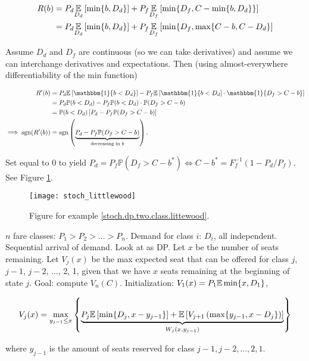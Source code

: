 \begin{example}
 \begin{align*}
 R(b) & = P_d \underset{D_d}{\mathbb{E}} \left[  \min\{b, D_d\} \right] + P_f  \underset{D_f}{\mathbb{E}} \left[ \min\{D_f, C - \min\{b, D_d\}\} \right]
 \\ & = P_d \underset{D_d}{\mathbb{E}} \left[  \min\{b, D_d\} \right] + P_f \underset{D_f}{\mathbb{E}} \left[ \min\{D_f,  \max\{C - b, C -  D_d\} \right]
 \end{align*}
 
Assume \(D_d\) and \(D_f\) are continuous (so we can take derivatives) and assume we can interchange derivatives and expectations. Then (using almost-everywhere differentiability of the min function)
 
\begin{align*}
 R'(b)  & = P_d \E \left[  \mathbbm{1}\{b < D_d \} \right] - P_f \E \left[ \mathbbm{1}\{b < D_d] \cdot \mathbbm{1}\{D_f > C - b\}\right]
 \\ & =  P_d \mathbb{P}( b < D_d )   - P_f  \mathbb{P}( b < D_d) \cdot \mathbb{P}( D_f > C - b)
 \\ & =  \mathbb{P}( b < D_d ) \left[ P_d  - P_f \mathbb{P}( D_f > C - b) \right]
 \\ \implies \operatorname{sgn}(R'(b)) & = \operatorname{sgn}\left( \underbrace{P_d  - P_f \mathbb{P}( D_f > C - b)}_{\text{decreasing in } b} \right).
\end{align*}

 Set equal to 0 to yield \(P_d = P_f \mathbb{P}(D_f > C - b^*) \iff C - b^* = F_f^{-1}(1 - P_d/P_f)\). See Figure \ref{stoch_littlewood_fig}. 

\begin{figure}[htbp]
\begin{center}
\texttt{[image: stoch\_littlewood]}
\caption{Figure for example \ref{stoch.dp.two.class.littewood}.}
\label{stoch_littlewood_fig}
\end{center}
\end{figure}


\end{example}

\begin{example}\label{stoch.dp.n.class.capacity}

\(n\) fare classes: \(P_1 > P_2 > \ldots > P_n\). Demand for class \(i\): \(D_i\), all independent. Sequential arrival of demand. Look at as DP. Let \(x\) be the number of seats remaining. Let \(V_j(x)\) be the max expected seat that can be offered for class \(j\), \(j-1\), \(j-2\), \(\ldots\), 2, 1, given that we have \(x\) seats remaining at the beginning of state \(j\). Goal: compute \(V_n(C)\). Initialization: \(V_1(x) = P_1 \mathbb{E} \min\{x, D_1\}\), 

\[
V_j(x) = \max_{y_{j-1} \leq x} \left\{  \underbrace{P_j \mathbb{E} \left[\min\{D_j, x - y_{j-1}\} \right]  + \mathbb{E} \left[ V_{j+1} \left( \max\{ y_{j-1}, x - D_j \}\right)  \right] }_{W_j(x, y_{j-1})}\right\}
\]

where \(y_{j-1}\) is the amount of seats reserved for class \(j-1, j-2, \ldots, 2, 1\).

\end{example}

